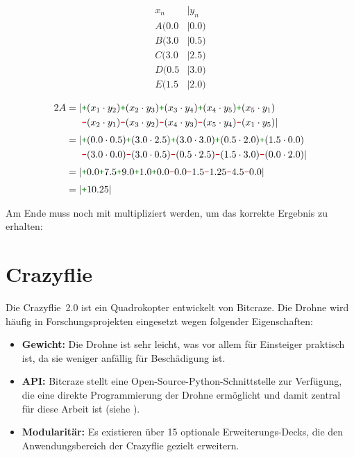 \begin{minipage}[t]{0.2\textwidth}
    \begin{align*}
        x_n &| y_n \\[3pt]
        A(0.0 &| 0.0) \\
        B(3.0 &| 0.5) \\
        C(3.0 &| 2.5) \\
        D(0.5 &| 3.0) \\
        E(1.5 &| 2.0)
    \end{align*}
\end{minipage}
\vline
\begin{minipage}[t]{0.7\textwidth}
    \begin{align*}
        2A = |&\cp (x_1 \cdot y_2) \cp (x_2 \cdot y_3) \cp (x_3 \cdot y_4) \cp (x_4 \cdot y_5) \cp (x_5 \cdot y_1) \\
        &\cm (x_2 \cdot y_1) \cm (x_3 \cdot y_2) \cm (x_4 \cdot y_3) \cm (x_5 \cdot y_4) \cm (x_1 \cdot y_5)| \\[3pt]
        = |&\cp (0.0 \cdot 0.5) \cp (3.0 \cdot 2.5) \cp (3.0 \cdot 3.0) \cp (0.5 \cdot 2.0) \cp (1.5 \cdot 0.0) \\
        &\cm (3.0 \cdot 0.0) \cm (3.0 \cdot 0.5) \cm (0.5 \cdot 2.5) \cm (1.5 \cdot 3.0) \cm (0.0 \cdot 2.0)| \\[3pt]
        = |&\cp 0.0 \cp 7.5 \cp 9.0 \cp 1.0 \cp 0.0 \cm 0.0 \cm 1.5 \cm 1.25 \cm 4.5 \cm 0.0| \\[3pt]
        = |&\cp 10.25|
    \end{align*}
\end{minipage}

Am Ende muss noch mit  multipliziert werden, um das korrekte Ergebnis zu erhalten: 

\section{Crazyflie}
Die Crazyflie~2.0 ist ein Quadrokopter entwickelt von Bitcraze.
Die Drohne wird häufig in Forschungsprojekten eingesetzt wegen folgender Eigenschaften:

\begin{itemize}
    \item \textbf{Gewicht:} Die Drohne ist sehr leicht, was vor allem für Einsteiger praktisch ist, da sie weniger anfällig für Beschädigung ist.
    \item \textbf{API:} Bitcraze stellt eine Open-Source-Python-Schnittstelle zur Verfügung, die eine direkte Programmierung der Drohne ermöglicht und damit zentral für diese Arbeit ist (siehe ).
    \item \textbf{Modularitär:} Es existieren über 15 optionale Erweiterungs-Decks, die den Anwendungsbereich der Crazyflie gezielt erweitern.
\end{itemize}


